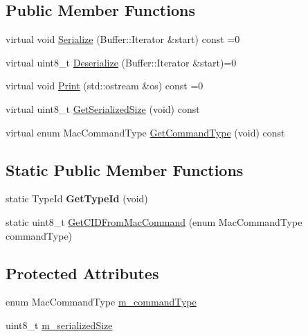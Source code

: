\subsection*{Public Member Functions}
\begin{DoxyCompactItemize}
\item 
virtual void \hyperlink{classns3_1_1lorawan_1_1MacCommand_a0ed44b33942ddc3dc9694dc06ab0b87f}{Serialize} (Buffer\+::\+Iterator \&start) const =0
\item 
virtual uint8\+\_\+t \hyperlink{classns3_1_1lorawan_1_1MacCommand_af12d223a71a67196bce498f1240eda75}{Deserialize} (Buffer\+::\+Iterator \&start)=0
\item 
virtual void \hyperlink{classns3_1_1lorawan_1_1MacCommand_a6bf88db38dab7dcd817811a9fb59f920}{Print} (std\+::ostream \&os) const =0
\item 
virtual uint8\+\_\+t \hyperlink{classns3_1_1lorawan_1_1MacCommand_a022ce0fc4c97d8f484340a1a18958640}{Get\+Serialized\+Size} (void) const
\item 
virtual enum Mac\+Command\+Type \hyperlink{classns3_1_1lorawan_1_1MacCommand_a79e55807f698d7c4dd2c2d7a6f20e0e7}{Get\+Command\+Type} (void) const
\end{DoxyCompactItemize}
\subsection*{Static Public Member Functions}
\begin{DoxyCompactItemize}
\item 
\mbox{\label{classns3_1_1lorawan_1_1MacCommand_a9fb2b2b6caeec4342da1ab248f36db03}} 
static Type\+Id {\bfseries Get\+Type\+Id} (void)
\item 
static uint8\+\_\+t \hyperlink{classns3_1_1lorawan_1_1MacCommand_ad1fbfeb5fe1f2325095c749093ff7435}{Get\+C\+I\+D\+From\+Mac\+Command} (enum Mac\+Command\+Type command\+Type)
\end{DoxyCompactItemize}
\subsection*{Protected Attributes}
\begin{DoxyCompactItemize}
\item 
enum Mac\+Command\+Type \hyperlink{classns3_1_1lorawan_1_1MacCommand_ab9de83798fe6c6cb9b732ef4118e3616}{m\+\_\+command\+Type}
\item 
uint8\+\_\+t \hyperlink{classns3_1_1lorawan_1_1MacCommand_a9601aad96a3e1fa0fdeed17bf588b048}{m\+\_\+serialized\+Size}
\end{DoxyCompactItemize}


